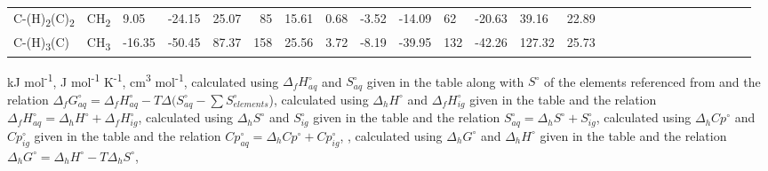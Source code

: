 {\begin{landscape}
\begin{table}
\begin{adjustbox}{width=600pt,keepaspectratio}
\begin{threeparttable}
\begin{tabular}{llerererererererererererer}
C-(H)\textsubscript{2}(C)\textsubscript{2} & CH\textsubscript{2} & 9.05 & -24.15 & 25.07 & 85 & 15.61 & 0.68 & -3.52 & -14.09 & 62 & -20.63 & 39.16 & 22.89 \\
C-(H)\textsubscript{3}(C) & CH\textsubscript{3} & -16.35 & -50.45 & 87.37 & 158 & 25.56 & 3.72 & -8.19 & -39.95 & 132 & -42.26 & 127.32 & 25.73 \\
\bottomrule
\end{tabular}%


  
  \begin{tablenotes}
     kJ mol\textsuperscript{-1},
     J mol\textsuperscript{-1} K\textsuperscript{-1},
     cm\textsuperscript{3} mol\textsuperscript{-1},
     calculated using $\Delta_{f}H^{\circ}_{aq}$ and $S^{\circ}_{aq}$ given in the table along with $S^{\circ}$ of the elements referenced from \cite{cox1989codata} and the relation $\Delta_{f}G^{\circ}_{aq} = \Delta_{f}H^{\circ}_{aq} - T\Delta(S_{aq}^{\circ}-\sum S_{elements}^{\circ}$),
     calculated using $\Delta_{h}H^{\circ}$ and $\Delta_{f}H^{\circ}_{ig}$ given in the table and the relation $\Delta_{f}H^{\circ}_{aq} = \Delta_{h}H^{\circ} + \Delta_{f}H^{\circ}_{ig}$,
     calculated using $\Delta_{h}S^{\circ}$ and $S^{\circ}_{ig}$ given in the table and the relation $S^{\circ}_{aq} = \Delta_{h}S^{\circ} + S^{\circ}_{ig}$,
     calculated using $\Delta_{h}Cp^{\circ}$ and $Cp^{\circ}_{ig}$ given in the table and the relation $Cp^{\circ}_{aq} = \Delta_{h}Cp^{\circ} + Cp^{\circ}_{ig}$,
     \cite{plyasunov2004group},
     calculated using $\Delta_{h}G^{\circ}$ and $\Delta_{h}H^{\circ}$ given in the table and the relation $\Delta_{h}G^{\circ} = \Delta_{h}H^{\circ} - T\Delta_{h} S^{\circ}$,
     \cite{domalski1993estimation}
        
  \end{tablenotes}
  
  \label{tab:grpadd}
  \end{threeparttable}
  \end{adjustbox}
\end{table}
\doublespace
\end{landscape}
\setcounter{tabcounter}{0} %
\clearpage
}
